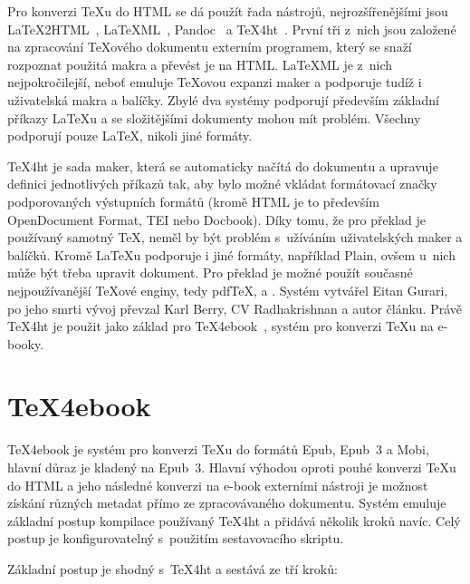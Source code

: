 \documentclass{csbulletin}
\begin{document}
Pro konverzi \TeX u do HTML se dá použít řada nástrojů, nejrozšířenějšími jsou
LaTeX2HTML~\cite{bib:latex2html},
LaTeXML~\cite{bib:latexml},
Pandoc~\cite{bib:pandoc} a
TeX4ht~\cite{bib:tex4ht}. První tři z~nich jsou založené na
zpracování \TeX ového dokumentu externím programem, který se snaží rozpoznat
použitá makra a převést je na HTML. LaTeXML je z~nich nejpokročilejší, neboť 
emuluje \TeX ovou expanzi maker a podporuje tudíž i uživatelská makra a
balíčky. Zbylé dva systémy podporují především základní příkazy \LaTeX u a se
složitějšími dokumenty mohou mít problém. Všechny podporují pouze \LaTeX,
nikoli jiné formáty. 

TeX4ht je sada maker, která se automaticky načítá do dokumentu a upravuje
definici jednotlivých příkazů tak, aby bylo možné vkládat formátovací značky
podporovaných výstupních formátů (kromě HTML je to především OpenDocument
Format, TEI nebo Docbook). Díky tomu, že pro překlad je používaný samotný \TeX,
neměl by být problém s~užíváním uživatelských maker a balíčků. Kromě \LaTeX u
podporuje i jiné formáty, například Plain, ovšem u~nich může být třeba upravit
dokument. Pro překlad je možné použít současné nejpoužívanější \TeX ové enginy,
tedy pdf\TeX, \XeTeX a \LuaTeX. Systém vytvářel Eitan Gurari, po jeho smrti
vývoj převzal Karl Berry, CV Radhakrishnan a autor článku. Právě TeX4ht je
použit jako základ pro TeX4ebook~\cite{bib:tex4ebook},
systém pro konverzi \TeX u na e-booky.

\section{TeX4ebook}

TeX4ebook je systém pro konverzi \TeX u do formátů Epub, Epub~3 a Mobi, hlavní
důraz je kladený na Epub~3. Hlavní výhodou oproti pouhé konverzi \TeX u do HTML
a jeho následné konverzi na e-book externími nástroji je možnost získání
různých metadat přímo ze zpracovávaného dokumentu. Systém emuluje základní
postup kompilace používaný TeX4ht a přidává několik kroků navíc. Celý postup je
konfigurovatelný s~použitím sestavovacího skriptu.

Základní postup je shodný s~TeX4ht a sestává ze tří kroků:
\end{document}
